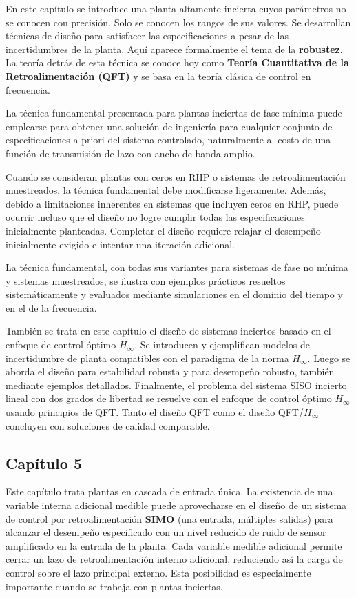 En este capítulo se introduce una planta altamente incierta cuyos parámetros no se conocen con precisión. Solo se conocen los rangos de sus valores. Se desarrollan técnicas de diseño para satisfacer las especificaciones a pesar de las incertidumbres de la planta. Aquí aparece formalmente el tema de la \textbf{robustez}. La teoría detrás de esta técnica se conoce hoy como \textbf{Teoría Cuantitativa de la Retroalimentación (QFT)} y se basa en la teoría clásica de control en frecuencia.

La técnica fundamental presentada para plantas inciertas de fase mínima puede emplearse para obtener una solución de ingeniería para cualquier conjunto de especificaciones a priori del sistema controlado, naturalmente al costo de una función de transmisión de lazo con ancho de banda amplio.

Cuando se consideran plantas con ceros en RHP o sistemas de retroalimentación muestreados, la técnica fundamental debe modificarse ligeramente. Además, debido a limitaciones inherentes en sistemas que incluyen ceros en RHP, puede ocurrir incluso que el diseño no logre cumplir todas las especificaciones inicialmente planteadas. Completar el diseño requiere relajar el desempeño inicialmente exigido e intentar una iteración adicional.

La técnica fundamental, con todas sus variantes para sistemas de fase no mínima y sistemas muestreados, se ilustra con ejemplos prácticos resueltos sistemáticamente y evaluados mediante simulaciones en el dominio del tiempo y en el de la frecuencia.

También se trata en este capítulo el diseño de sistemas inciertos basado en el enfoque de control óptimo \(H_{\infty}\). Se introducen y ejemplifican modelos de incertidumbre de planta compatibles con el paradigma de la norma \(H_{\infty}\). Luego se aborda el diseño para estabilidad robusta y para desempeño robusto, también mediante ejemplos detallados. Finalmente, el problema del sistema SISO incierto lineal con dos grados de libertad se resuelve con el enfoque de control óptimo \(H_{\infty}\) usando principios de QFT. Tanto el diseño QFT como el diseño QFT/\(H_{\infty}\) concluyen con soluciones de calidad comparable.

\subsection{Capítulo 5}
Este capítulo trata plantas en cascada de entrada única. La existencia de una variable interna adicional medible puede aprovecharse en el diseño de un sistema de control por retroalimentación \textbf{SIMO} (una entrada, múltiples salidas) para alcanzar el desempeño especificado con un nivel reducido de ruido de sensor amplificado en la entrada de la planta. Cada variable medible adicional permite cerrar un lazo de retroalimentación interno adicional, reduciendo así la carga de control sobre el lazo principal externo. Esta posibilidad es especialmente importante cuando se trabaja con plantas inciertas.

